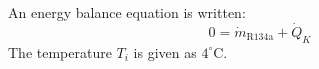 An energy balance equation is written:  
\[
0 = \dot{m}_{\text{R134a}} + \dot{Q}_K
\]  
The temperature \( T_i \) is given as \( 4^\circ\text{C} \).